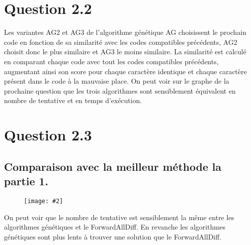 \documentclass[a4paper, 12pt]{report}
\newcommand{\cfigure}[3][6cm]{
	\begin{figure}[H]
		\centering
		\texttt{[image: \#2]}
		\caption{#3}
	\end{figure}
}
\begin{document}
\section*{Question 2.2}
Les variantes AG2 et AG3 de l'algorithme génétique AG choisissent le prochain code en fonction de sa similarité avec les codes compatibles précédents, AG2 choisit donc le plus similaire et AG3 le moins similaire.
La similarité est calculé en comparant chaque code avec tout les codes compatibles précédents, augmentant ainsi son score pour chaque caractère identique et chaque caractère présent dans le code à la mauvaise place.
On peut voir sur le graphe de la prochaine question que les trois algorithmes sont sensiblement équivalent en nombre de tentative et en temps d'exécution. 
\section*{Question 2.3}
\subsection*{Comparaison avec la meilleur méthode la partie 1.}
\cfigure[7cm]{Figure_1.png}{}

On peut voir que le nombre de tentative est sensiblement la même entre les algorithmes génétiques et le ForwardAllDiff. En revanche les algorithmes génétiques sont plus lents à trouver une solution que le ForwardAllDiff.
\end{document}
